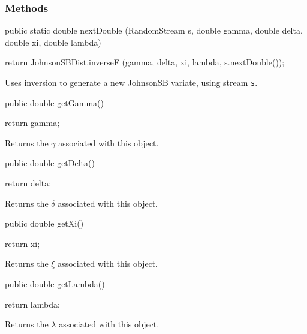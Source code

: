 \subsubsection* {Methods}
\begin{code}

   public static double nextDouble (RandomStream s, double gamma,
                                    double delta, double xi, double lambda) \begin{hide} {
      return JohnsonSBDist.inverseF (gamma, delta, xi, lambda,
                                        s.nextDouble());
   }\end{hide}
\end{code}
 \begin{tabb}  Uses inversion to generate a new JohnsonSB variate,
   using stream \texttt{s}.
 \end{tabb}
\begin{code}

   public double getGamma()\begin{hide} {
      return gamma;
   }
\end{hide}
\end{code}
\begin{tabb}
   Returns the $\gamma$ associated with this object.
\end{tabb}
\begin{code}

   public double getDelta()\begin{hide} {
      return delta;
   }
\end{hide}
\end{code}
\begin{tabb}
   Returns the $\delta$ associated with this object.
\end{tabb}
\begin{code}

   public double getXi()\begin{hide} {
      return xi;
   }
\end{hide}
\end{code}
\begin{tabb}
   Returns the $\xi$ associated with this object.
\end{tabb}
\begin{code}

   public double getLambda()\begin{hide} {
      return lambda;
   }
\end{hide}
\end{code}
\begin{tabb}
   Returns the $\lambda$ associated with this object.
\end{tabb}
